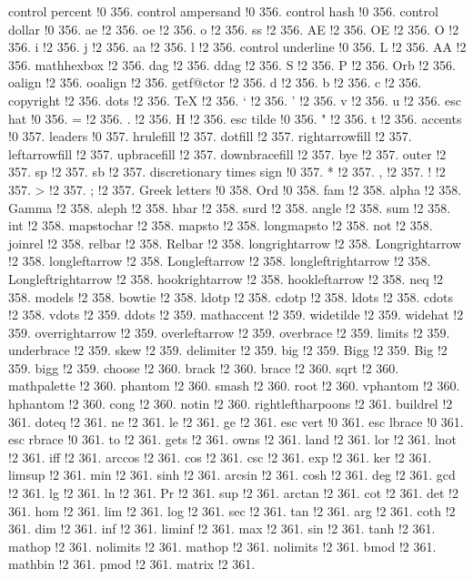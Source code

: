 control percent !0 356.
control ampersand !0 356.
control hash !0 356.
control dollar !0 356.
ae !2 356.
oe !2 356.
o !2 356.
ss !2 356.
AE !2 356.
OE !2 356.
O !2 356.
i !2 356.
j !2 356.
aa !2 356.
l !2 356.
control underline !0 356.
L !2 356.
AA !2 356.
mathhexbox !2 356.
dag !2 356.
ddag !2 356.
S !2 356.
P !2 356.
Orb !2 356.
oalign !2 356.
ooalign !2 356.
getf@ctor !2 356.
d !2 356.
b !2 356.
c !2 356.
copyright !2 356.
dots !2 356.
TeX !2 356.
` !2 356.
' !2 356.
v !2 356.
u !2 356.
esc hat !0 356.
= !2 356.
. !2 356.
H !2 356.
esc tilde !0 356.
" !2 356.
t !2 356.
accents !0 357.
leaders !0 357.
hrulefill !2 357.
dotfill !2 357.
rightarrowfill !2 357.
leftarrowfill !2 357.
upbracefill !2 357.
downbracefill !2 357.
bye !2 357.
outer !2 357.
sp !2 357.
sb !2 357.
discretionary times sign !0 357.
* !2 357.
, !2 357.
! !2 357.
> !2 357.
; !2 357.
Greek letters !0 358.
Ord !0 358.
fam !2 358.
alpha !2 358.
Gamma !2 358.
aleph !2 358.
hbar !2 358.
surd !2 358.
angle !2 358.
sum !2 358.
int !2 358.
mapstochar !2 358.
mapsto !2 358.
longmapsto !2 358.
not !2 358.
joinrel !2 358.
relbar !2 358.
Relbar !2 358.
longrightarrow !2 358.
Longrightarrow !2 358.
longleftarrow !2 358.
Longleftarrow !2 358.
longleftrightarrow !2 358.
Longleftrightarrow !2 358.
hookrightarrow !2 358.
hookleftarrow !2 358.
neq !2 358.
models !2 358.
bowtie !2 358.
ldotp !2 358.
cdotp !2 358.
ldots !2 358.
cdots !2 358.
vdots !2 359.
ddots !2 359.
mathaccent !2 359.
widetilde !2 359.
widehat !2 359.
overrightarrow !2 359.
overleftarrow !2 359.
overbrace !2 359.
limits !2 359.
underbrace !2 359.
skew !2 359.
delimiter !2 359.
big !2 359.
Bigg !2 359.
Big !2 359.
bigg !2 359.
choose !2 360.
brack !2 360.
brace !2 360.
sqrt !2 360.
mathpalette !2 360.
phantom !2 360.
smash !2 360.
root !2 360.
vphantom !2 360.
hphantom !2 360.
cong !2 360.
notin !2 360.
rightleftharpoons !2 361.
buildrel !2 361.
doteq !2 361.
ne !2 361.
le !2 361.
ge !2 361.
esc vert !0 361.
esc lbrace !0 361.
esc rbrace !0 361.
to !2 361.
gets !2 361.
owns !2 361.
land !2 361.
lor !2 361.
lnot !2 361.
iff !2 361.
arccos !2 361.
cos !2 361.
csc !2 361.
exp !2 361.
ker !2 361.
limsup !2 361.
min !2 361.
sinh !2 361.
arcsin !2 361.
cosh !2 361.
deg !2 361.
gcd !2 361.
lg !2 361.
ln !2 361.
Pr !2 361.
sup !2 361.
arctan !2 361.
cot !2 361.
det !2 361.
hom !2 361.
lim !2 361.
log !2 361.
sec !2 361.
tan !2 361.
arg !2 361.
coth !2 361.
dim !2 361.
inf !2 361.
liminf !2 361.
max !2 361.
sin !2 361.
tanh !2 361.
mathop !2 361.
nolimits !2 361.
mathop !2 361.
nolimits !2 361.
bmod !2 361.
mathbin !2 361.
pmod !2 361.
matrix !2 361.
